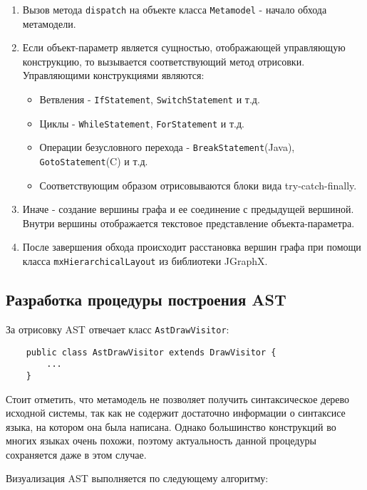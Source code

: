 \begin{enumerate}
    \item Вызов метода \texttt{dispatch} на объекте класса \texttt{Metamodel} -
    начало обхода метамодели.
    \item Если объект-параметр является сущностью, отображающей управляющую
    конструкцию, то вызывается соответствующий метод отрисовки. Управляющими
    конструкциями являются:
        \begin{itemize}
            \item Ветвления - \texttt{IfStatement}, \texttt{SwitchStatement} и т.д.
            \item Циклы - \texttt{WhileStatement}, \texttt{ForStatement} и т.д.
            \item Операции безусловного перехода - \texttt{BreakStatement}(Java),
            \texttt{GotoStatement}(C) и т.д.
            \item Соответствующим образом отрисовываются блоки вида try-catch-finally.
        \end{itemize}
    \item Иначе - создание вершины графа и ее соединение с предыдущей вершиной.
    Внутри вершины отображается текстовое представление объекта-параметра.
    \item После завершения обхода происходит расстановка вершин графа при помощи
    класса \texttt{mxHierarchicalLayout} из библиотеки JGraphX.
\end{enumerate}

\subsection{Разработка процедуры построения AST}

За отрисовку AST отвечает класс \texttt{AstDrawVisitor}:

\begin{lstlisting}
    public class AstDrawVisitor extends DrawVisitor {
        ...
    }
\end{lstlisting}

Стоит отметить, что метамодель не позволяет получить синтаксическое дерево
исходной системы, так как не содержит достаточно информации о синтаксисе языка,
на котором она была написана. Однако большинство конструкций во многих языках
очень похожи, поэтому актуальность данной процедуры сохраняется даже в этом
случае.

Визуализация AST выполняется по следующему алгоритму:

